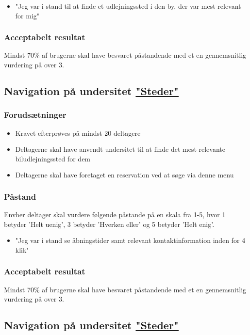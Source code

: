 \documentclass[a4paper,10pt]{article}
\begin{document}
\begin{itemize}
	\item "Jeg var i stand til at finde et udlejningssted i den by, der var mest relevant for mig"
\end{itemize}

\subsubsection{Acceptabelt resultat}
Mindst 70\% af brugerne skal have besvaret påstandende med et en gennemsnitlig vurdering på over 3. 

\subsection{Navigation på undersitet \href{https://www.enterprise.dk/da_DK/car-rental/locations.html}{"Steder"}}

\subsubsection{Forudsætninger}
\begin{itemize}
	\item Kravet efterprøves på mindst 20 deltagere
	\item Deltagerne skal have anvendt undersitet til at finde det mest relevante biludlejningssted for dem
	\item Deltagerne skal have foretaget en reservation ved at søge via denne menu
\end{itemize}
\subsubsection{Påstand}
Envher deltager skal vurdere følgende påstande på en skala fra 1-5, hvor 1 betyder 'Helt uenig', 3 betyder 'Hverken eller' og 5 betyder 'Helt enig'. 

\begin{itemize}
	\item "Jeg var i stand se åbningstider samt relevant kontaktinformation inden for 4 klik"
\end{itemize}

\subsubsection{Acceptabelt resultat}
Mindst 70\% af brugerne skal have besvaret påstandende med et en gennemsnitlig vurdering på over 3. 

\subsection{Navigation på undersitet \href{https://www.enterprise.dk/da_DK/car-rental/locations.html}{"Steder"}}
\end{document}
